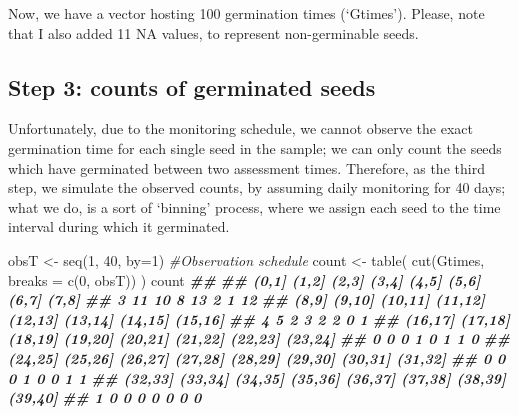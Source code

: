 \documentclass[
]{book}
\newenvironment{Shaded}{\begin{snugshade}}{\end{snugshade}}
\newcommand{\AttributeTok}[1]{\textcolor[rgb]{0.77,0.63,0.00}{#1}}
\newcommand{\CommentTok}[1]{\textcolor[rgb]{0.56,0.35,0.01}{\textit{#1}}}
\newcommand{\DecValTok}[1]{\textcolor[rgb]{0.00,0.00,0.81}{#1}}
\newcommand{\DocumentationTok}[1]{\textcolor[rgb]{0.56,0.35,0.01}{\textbf{\textit{#1}}}}
\newcommand{\FunctionTok}[1]{\textcolor[rgb]{0.00,0.00,0.00}{#1}}
\newcommand{\NormalTok}[1]{#1}
\newcommand{\OtherTok}[1]{\textcolor[rgb]{0.56,0.35,0.01}{#1}}
\begin{document}
Now, we have a vector hosting 100 germination times (`Gtimes'). Please, note that I also added 11 NA values, to represent non-germinable seeds.

\hypertarget{step-3-counts-of-germinated-seeds}{%
\subsection{Step 3: counts of germinated seeds}\label{step-3-counts-of-germinated-seeds}}

Unfortunately, due to the monitoring schedule, we cannot observe the exact germination time for each single seed in the sample; we can only count the seeds which have germinated between two assessment times. Therefore, as the third step, we simulate the observed counts, by assuming daily monitoring for 40 days; what we do, is a sort of `binning' process, where we assign each seed to the time interval during which it germinated.

\begin{Shaded}
\begin{Highlighting}[]
\NormalTok{obsT }\OtherTok{\textless{}{-}} \FunctionTok{seq}\NormalTok{(}\DecValTok{1}\NormalTok{, }\DecValTok{40}\NormalTok{, }\AttributeTok{by=}\DecValTok{1}\NormalTok{) }\CommentTok{\#Observation schedule}
\NormalTok{count }\OtherTok{\textless{}{-}} \FunctionTok{table}\NormalTok{( }\FunctionTok{cut}\NormalTok{(Gtimes, }\AttributeTok{breaks =} \FunctionTok{c}\NormalTok{(}\DecValTok{0}\NormalTok{, obsT)) )}
\NormalTok{count}
\DocumentationTok{\#\# }
\DocumentationTok{\#\#   (0,1]   (1,2]   (2,3]   (3,4]   (4,5]   (5,6]   (6,7]   (7,8] }
\DocumentationTok{\#\#       3      11      10       8      13       2       1      12 }
\DocumentationTok{\#\#   (8,9]  (9,10] (10,11] (11,12] (12,13] (13,14] (14,15] (15,16] }
\DocumentationTok{\#\#       4       5       2       3       2       2       0       1 }
\DocumentationTok{\#\# (16,17] (17,18] (18,19] (19,20] (20,21] (21,22] (22,23] (23,24] }
\DocumentationTok{\#\#       0       0       0       1       0       1       1       0 }
\DocumentationTok{\#\# (24,25] (25,26] (26,27] (27,28] (28,29] (29,30] (30,31] (31,32] }
\DocumentationTok{\#\#       0       0       0       1       0       0       1       1 }
\DocumentationTok{\#\# (32,33] (33,34] (34,35] (35,36] (36,37] (37,38] (38,39] (39,40] }
\DocumentationTok{\#\#       1       0       0       0       0       0       0       0}
\end{Highlighting}
\end{Shaded}
\end{document}
